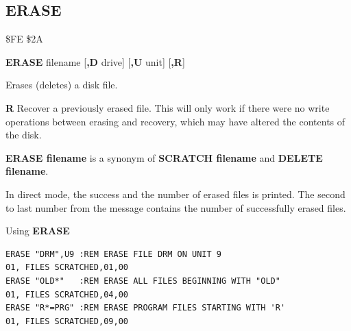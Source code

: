 \subsection{ERASE}
\label{BASIC 65 Commands!ERASE}
\begin{description}[leftmargin=2cm,style=nextline]
\item [Token:] \$FE \$2A
\item [Format:] {\bf ERASE} filename [{\bf,D} drive] [{\bf,U} unit] [{\bf,R}]
\item [Usage:] Erases (deletes) a disk file.

   \filenamedefinition

   \drivedefinition

   \unitdefinition

   {\bf R} Recover a previously erased file.
   This will only work if there were no write operations
   between erasing and recovery, which may have altered the
   contents of the disk.

\item [Remarks:] {\bf ERASE filename} is a synonym of {\bf SCRATCH filename}
                  and {\bf DELETE filename}.

   In direct mode, the success and the number of erased files is printed.
                 The second to last number from the message
                 contains the number of successfully erased files.

\item [Examples:] Using {\bf ERASE}
\begin{tcolorbox}[colback=black,coltext=white]
\verbatimfont{\codefont}
\begin{verbatim}
ERASE "DRM",U9 :REM ERASE FILE DRM ON UNIT 9
01, FILES SCRATCHED,01,00
ERASE "OLD*"   :REM ERASE ALL FILES BEGINNING WITH "OLD"
01, FILES SCRATCHED,04,00
ERASE "R*=PRG" :REM ERASE PROGRAM FILES STARTING WITH 'R'
01, FILES SCRATCHED,09,00
\end{verbatim}
\end{tcolorbox}
\end{description}


\newpage
